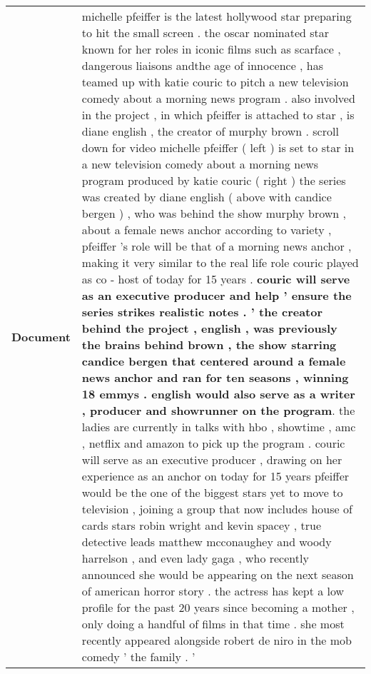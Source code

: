 \documentclass[11pt,a4paper]{article}
\begin{document}
\begin{table*}[t]
    \centering
\begin{center}
    \begin{tabular}{|P{1.5cm}@{}| p{13.8cm}|}
    \hline
    \small \textbf{Document} & michelle pfeiffer is the latest hollywood star preparing to hit the small screen .   the oscar nominated star known for her roles in iconic films such as scarface , dangerous liaisons andthe age of innocence ,  has teamed up with katie couric to pitch a new television comedy about a morning news program .   also involved in the project ,  in which pfeiffer is attached to star ,  is diane english ,  the creator of murphy brown .   scroll down for video  michelle pfeiffer ( left ) is set to star in a new television comedy about a morning news program produced by katie couric ( right )  the series was created by diane english ( above with candice bergen ) ,  who was behind the show murphy brown ,  about a female news anchor  according to variety ,  pfeiffer 's role will be that of a morning news anchor ,  making it very similar to the real life role couric played as co - host of today for 15 years . \textbf{couric will serve as an executive producer and help ' ensure the series strikes realistic notes .  ' the creator behind the project ,  english ,  was previously the brains behind brown ,  the show starring candice bergen that centered around a female news anchor and ran for ten seasons ,  winning 18 emmys .   english would also serve as a writer ,  producer and showrunner on the program}.   the ladies are currently in talks with hbo ,  showtime ,  amc ,  netflix and amazon to pick up the program .   couric will serve as an executive producer ,  drawing on her experience as an anchor on today for 15 years  pfeiffer would be the one of the biggest stars yet to move to television ,  joining a group that now includes house of cards stars robin wright and kevin spacey ,  true detective leads matthew mcconaughey and woody harrelson ,  and even lady gaga ,  who recently announced she would be appearing on the next season of american horror story .   the actress has kept a low profile for the past 20 years since becoming a mother ,  only doing a handful of films in that time .   she most recently appeared alongside robert de niro in the mob comedy ' the family .  '


\end{tabular}
\end{center}
\end{table*}
\end{document}
